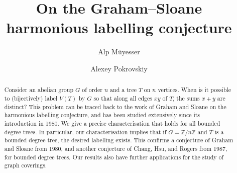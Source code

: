 \documentclass[a4paper,11pt,hidelinks]{amsart}
\title{On the Graham--Sloane harmonious labelling conjecture}
\author{Alp M\"uyesser}
\author{Alexey Pokrovskiy}
\theoremstyle{definition}
\begin{document}
\begin{abstract}
    Consider an abelian group $G$ of order $n$ and a tree $T$ on $n$ vertices. When is it possible to (bijectively) label $V(T)$ by $G$ so that along all edges $xy$ of $T$, the sums $x+y$ are distinct? This problem can be traced back to the work of Graham and Sloane on the harmonious labelling conjecture, and has been studied extensively since its introduction in 1980. We give a precise characterisation that holds for all bounded degree trees. In particular, our characterisation implies that if $G=\mathbb{Z}/n\mathbb{Z}$ and $T$ is a bounded degree tree, the desired labelling exists. This confirms a conjecture of Graham and Sloane from 1980, and another conjecture of Chang, Hsu, and Rogers from 1987, for bounded degree trees. Our results also have further applications for the study of graph coverings.   %
\end{abstract}
\maketitle
\end{document}
